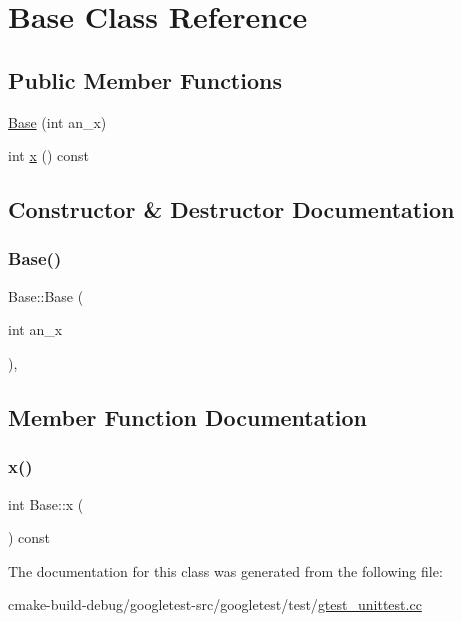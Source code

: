 \hypertarget{classBase}{}\section{Base Class Reference}
\label{classBase}
\subsection*{Public Member Functions}
\begin{DoxyCompactItemize}
\item 
\mbox{\hyperlink{classBase_a1d5f3fb92f8cbc687705785bdc6abd18}{Base}} (int an\+\_\+x)
\item 
int \mbox{\hyperlink{classBase_a779fd2b157ebd763b15383d96047e07c}{x}} () const
\end{DoxyCompactItemize}


\subsection{Constructor \& Destructor Documentation}
\mbox{\label{classBase_a1d5f3fb92f8cbc687705785bdc6abd18}} 
\subsubsection{\texorpdfstring{Base()}{Base()}}
{\footnotesize\ttfamily Base\+::\+Base (\begin{DoxyParamCaption}\item[{int}]{an\+\_\+x }\end{DoxyParamCaption})\hspace{0.3cm}{\ttfamily [inline]}, {\ttfamily [explicit]}}



\subsection{Member Function Documentation}
\mbox{\label{classBase_a779fd2b157ebd763b15383d96047e07c}} 
\subsubsection{\texorpdfstring{x()}{x()}}
{\footnotesize\ttfamily int Base\+::x (\begin{DoxyParamCaption}{ }\end{DoxyParamCaption}) const\hspace{0.3cm}{\ttfamily [inline]}}



The documentation for this class was generated from the following file\+:\begin{DoxyCompactItemize}
\item 
cmake-\/build-\/debug/googletest-\/src/googletest/test/\mbox{\hyperlink{gtest__unittest_8cc}{gtest\+\_\+unittest.\+cc}}\end{DoxyCompactItemize}
